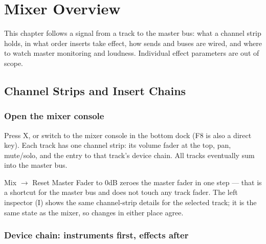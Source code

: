 
\chapter{Mixer Overview}
\label{ch:mixer-overview}






This chapter follows a signal from a track to the master bus: what a channel strip
holds, in what order inserts take effect, how sends and buses are wired, and where to
watch master monitoring and loudness. Individual effect parameters are out of scope.

\section{Channel Strips and Insert Chains}

\subsection{Open the mixer console}

Press X, or switch to the mixer console in the bottom dock (F8 is also a direct key).
Each track has one channel strip: its volume fader at the top, pan, mute/solo, and the
entry to that track's device chain. All tracks eventually sum into the master bus.

Mix $\to$ Reset Master Fader to 0dB zeroes the master fader in one step — that is a
shortcut for the master bus and does not touch any track fader. The left inspector (I)
shows the same channel-strip details for the selected track; it is the same state as
the mixer, so changes in either place agree.


\subsection{Device chain: instruments first, effects after}

